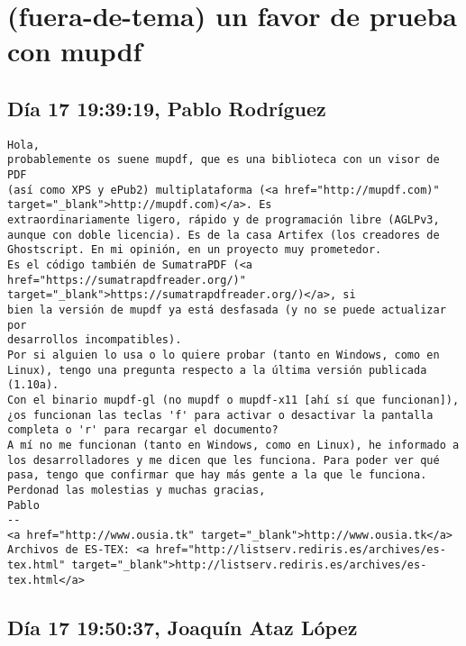 \documentclass[a4paper,10pt]{article}
\begin{document}
\section{(fuera-de-tema) un favor de prueba con mupdf}

\subsection{Día 17 19:39:19, Pablo Rodríguez}

\begin{lstlisting}
Hola,
probablemente os suene mupdf, que es una biblioteca con un visor de PDF
(así como XPS y ePub2) multiplataforma (<a href="http://mupdf.com)" target="_blank">http://mupdf.com)</a>. Es
extraordinariamente ligero, rápido y de programación libre (AGLPv3,
aunque con doble licencia). Es de la casa Artifex (los creadores de
Ghostscript. En mi opinión, en un proyecto muy prometedor.
Es el código también de SumatraPDF (<a href="https://sumatrapdfreader.org/)" target="_blank">https://sumatrapdfreader.org/)</a>, si
bien la versión de mupdf ya está desfasada (y no se puede actualizar por
desarrollos incompatibles).
Por si alguien lo usa o lo quiere probar (tanto en Windows, como en
Linux), tengo una pregunta respecto a la última versión publicada (1.10a).
Con el binario mupdf-gl (no mupdf o mupdf-x11 [ahí sí que funcionan]),
¿os funcionan las teclas 'f' para activar o desactivar la pantalla
completa o 'r' para recargar el documento?
A mí no me funcionan (tanto en Windows, como en Linux), he informado a
los desarrolladores y me dicen que les funciona. Para poder ver qué
pasa, tengo que confirmar que hay más gente a la que le funciona.
Perdonad las molestias y muchas gracias,
Pablo
-- 
<a href="http://www.ousia.tk" target="_blank">http://www.ousia.tk</a>
Archivos de ES-TEX: <a href="http://listserv.rediris.es/archives/es-tex.html" target="_blank">http://listserv.rediris.es/archives/es-tex.html</a>

\end{lstlisting}

\subsection{Día 17 19:50:37, Joaquín Ataz López}
\end{document}
